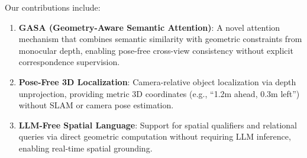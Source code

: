 
\noindent Our contributions include:
\begin{enumerate}[nosep,leftmargin=*]
    \item \textbf{GASA (Geometry-Aware Semantic Attention)}: A novel attention mechanism that combines semantic similarity with geometric constraints from monocular depth, enabling pose-free cross-view consistency without explicit correspondence supervision.


    \item \textbf{Pose-Free 3D Localization}: Camera-relative object localization via depth unprojection, providing metric 3D coordinates (e.g., ``1.2m ahead, 0.3m left'') without SLAM or camera pose estimation.

    \item \textbf{LLM-Free Spatial Language}: Support for spatial qualifiers and relational queries via direct geometric computation without requiring LLM inference, enabling real-time spatial grounding.
\end{enumerate}


